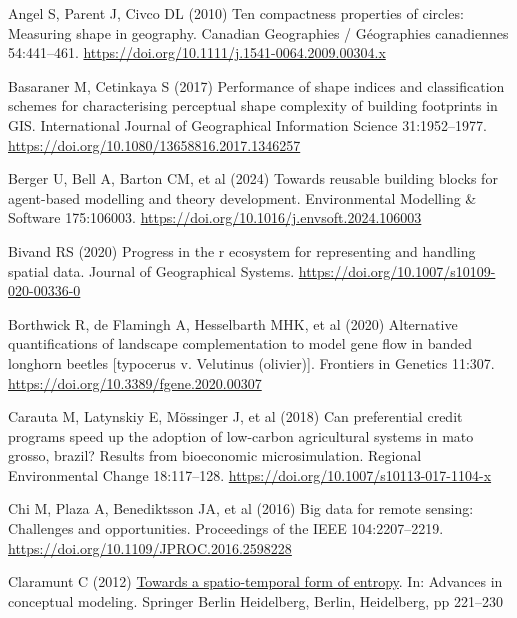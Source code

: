 \documentclass[
  10pt,
  a4paperpaper,
]{article}
\newlength{\cslhangindent}
\newenvironment{CSLReferences}[2] %
 {\begin{list}{}{%
  \setlength{\itemindent}{0pt}
  \setlength{\leftmargin}{0pt}
  \setlength{\parsep}{0pt}
  \ifodd #1
   \setlength{\leftmargin}{\cslhangindent}
   \setlength{\itemindent}{-1\cslhangindent}
  \fi
  \setlength{\itemsep}{#2\baselineskip}}}
 {\end{list}}
\begin{document}
\label{refs}
\begin{CSLReferences}{1}{1}
Angel S, Parent J, Civco DL (2010) Ten compactness properties of
circles: Measuring shape in geography. Canadian Geographies /
G{é}ographies canadiennes 54:441--461.
\url{https://doi.org/10.1111/j.1541-0064.2009.00304.x}

Basaraner M, Cetinkaya S (2017) Performance of shape indices and
classification schemes for characterising perceptual shape complexity of
building footprints in GIS. International Journal of Geographical
Information Science 31:1952--1977.
\url{https://doi.org/10.1080/13658816.2017.1346257}

Berger U, Bell A, Barton CM, et al (2024) Towards reusable building
blocks for agent-based modelling and theory development. Environmental
Modelling \& Software 175:106003.
\url{https://doi.org/10.1016/j.envsoft.2024.106003}

Bivand RS (2020) Progress in the r ecosystem for representing and
handling spatial data. Journal of Geographical Systems.
\url{https://doi.org/10.1007/s10109-020-00336-0}

Borthwick R, de Flamingh A, Hesselbarth MHK, et al (2020) Alternative
quantifications of landscape complementation to model gene flow in
banded longhorn beetles {[}typocerus v. Velutinus (olivier){]}.
Frontiers in Genetics 11:307.
\url{https://doi.org/10.3389/fgene.2020.00307}

Carauta M, Latynskiy E, Mössinger J, et al (2018) Can preferential
credit programs speed up the adoption of low-carbon agricultural systems
in mato grosso, brazil? Results from bioeconomic microsimulation.
Regional Environmental Change 18:117--128.
\url{https://doi.org/10.1007/s10113-017-1104-x}

Chi M, Plaza A, Benediktsson JA, et al (2016) Big data for remote
sensing: Challenges and opportunities. Proceedings of the IEEE
104:2207--2219. \url{https://doi.org/10.1109/JPROC.2016.2598228}

Claramunt C (2012)
\href{https://doi.org/10.1007/978-3-642-33999-8_28}{Towards a
spatio-temporal form of entropy}. In: Advances in conceptual modeling.
Springer Berlin Heidelberg, Berlin, Heidelberg, pp 221--230


\end{CSLReferences}
\end{document}
